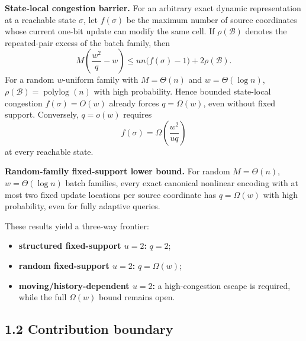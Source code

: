 \documentclass[
]{article}
\providecommand{\tightlist}{%
  \setlength{\itemsep}{0pt}\setlength{\parskip}{0pt}}
\begin{document}
\textbf{State-local congestion barrier.} For an arbitrary exact dynamic
representation at a reachable state \(\sigma\), let \(f(\sigma)\) be the
maximum number of source coordinates whose current one-bit update can
modify the same cell. If \(\rho(\mathcal B)\) denotes the repeated-pair
excess of the batch family, then \[
 M\left(\frac{w^2}{q}-w\right)
 \le
 un\bigl(f(\sigma)-1\bigr)+2\rho(\mathcal B).
\] For a random \(w\)-uniform family with \(M=\Theta(n)\) and
\(w=\Theta(\log n)\), \(\rho(\mathcal B)=\operatorname{polylog}(n)\)
with high probability. Hence bounded state-local congestion
\(f(\sigma)=O(w)\) already forces \(q=\Omega(w)\), even without fixed
support. Conversely, \(q=o(w)\) requires \[
 f(\sigma)=\Omega\!\left(\frac{w^2}{uq}\right)
\] at every reachable state.

\textbf{Random-family fixed-support lower bound.} For random
\(M=\Theta(n)\), \(w=\Theta(\log n)\) batch families, every exact
canonical nonlinear encoding with at most two fixed update locations per
source coordinate has \(q=\Omega(w)\) with high probability, even for
fully adaptive queries.

These results yield a three-way frontier:

\begin{itemize}
\tightlist
\item
  \textbf{structured fixed-support \(u=2\):} \(q=2\);
\item
  \textbf{random fixed-support \(u=2\):} \(q=\Omega(w)\);
\item
  \textbf{moving/history-dependent \(u=2\):} a high-congestion escape is
  required, while the full \(\Omega(w)\) bound remains open.
\end{itemize}

\hypertarget{contribution-boundary}{%
\subsection{1.2 Contribution boundary}\label{contribution-boundary}}
\end{document}
